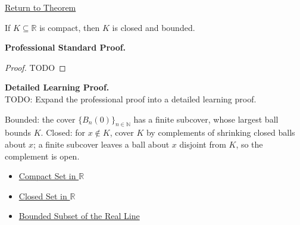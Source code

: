 \newpage
{}
\label{prf:compact-implies-closed-bounded}

\begin{remark*}[Return]
\hyperref[thm:compact-implies-closed-bounded]{Return to Theorem}
\end{remark*}

\begin{theorem*}
If $K\subseteq\mathbb{R}$ is compact, then $K$ is closed and bounded.
\end{theorem*}

\textbf{Professional Standard Proof.}~\\
\begin{proof}
TODO
\end{proof}

\textbf{Detailed Learning Proof.}~\\
TODO: Expand the professional proof into a detailed learning proof.

\begin{remark*}
Bounded: the cover $\{B_n(0)\}_{n\in\mathbb{N}}$ has a finite subcover, whose largest ball bounds $K$. Closed: for $x\notin K$, cover $K$ by complements of shrinking closed balls about $x$; a finite subcover leaves a ball about $x$ disjoint from $K$, so the complement is open.
\end{remark*}

\begin{dependencies}
\begin{itemize}
  \item \hyperref[def:compact-set]{Compact Set in $\mathbb{R}$}
  \item \hyperref[def:closed-set]{Closed Set in $\mathbb{R}$}
  \item \hyperref[def:bounded-subset-of-r]{Bounded Subset of the Real Line}
\end{itemize}
\end{dependencies}
